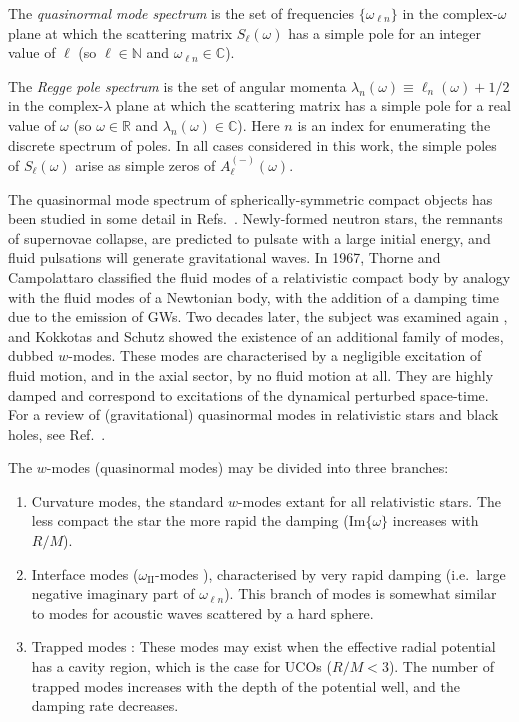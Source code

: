 \documentclass[aps,prd,longbibliography,reprint,twocolumn,amsmath,amssymb,amsfonts,showpacs,footnote,superscriptaddress]{revtex4-1}%
\begin{document}
The \emph{quasinormal mode spectrum} is the set of frequencies $\{ \omega_{\ell n} \}$ in the complex-$\omega$ plane at which the scattering matrix $ S_{\ell}(\omega)$ has a simple pole for an integer value of $\ell$ (so $\ell \in \mathbb{N}$ and $\omega_{\ell n} \in \mathbb{C}$).

The \emph{Regge pole spectrum} is the set of angular momenta $\lambda_{n}(\omega) \equiv \ell_{n}(\omega) + 1/2$ in the complex-$\lambda$ plane at which the scattering matrix has a simple pole for a real value of $\omega$ (so $\omega \in \mathbb{R}$ and $\lambda_{n}(\omega) \in \mathbb{C}$). Here $n$ is an index for enumerating the discrete spectrum of poles. In all cases considered in this work, the simple poles of $S_{\ell}(\omega)$ arise as simple zeros of $A_{\ell}^{(-)}(\omega)$.

The quasinormal mode spectrum of spherically-symmetric compact objects has been studied in some detail in Refs.~\cite{Kokkotas:1986gd,Kokkotas:1992ka,Andersson:1997eq,Kokkotas:1999bd,Leins:1993zz}.
Newly-formed neutron stars, the remnants of supernovae collapse, are predicted to pulsate with a large initial energy, and fluid pulsations will generate gravitational waves. In 1967, Thorne and Campolattaro \cite{thorne1967non} classified the fluid modes of a relativistic compact body by analogy with the fluid modes of a Newtonian body, with the addition of a damping time due to the emission of GWs. Two decades later, the subject was examined again \cite{Detweiler:1985zz,Kokkotas:1986gd}, and Kokkotas and Schutz \cite{Kokkotas:1992ka} showed the existence of an additional family of modes, dubbed $w$-modes. These modes are characterised by a negligible excitation of fluid motion, and in the axial sector, by no fluid motion at all. They are highly damped and correspond to excitations of the dynamical perturbed space-time. For a review of (gravitational) quasinormal modes in relativistic stars and black holes, see Ref.~\cite{Kokkotas:1999bd}.

The $w$-modes (quasinormal modes) may be divided into three branches:
	\begin{enumerate}
   \item Curvature modes, the standard $w$-modes extant for all relativistic stars. The less compact the star the more rapid the damping (Im$\{\omega\}$ increases with $R/M$).
   \item Interface modes ($\omega_{\text{II}}$-modes \cite{Leins:1993zz}), characterised by very rapid damping (i.e.~large negative imaginary part of $\omega_{\ell n}$). This branch of modes is somewhat similar to modes for acoustic waves scattered by a hard sphere.
   \item Trapped modes \cite{Chandrasekhar449}: These modes may exist when the effective radial potential has a cavity region, which is the case for UCOs ($R/M < 3$). %
   The number of trapped modes increases with the depth of the potential well, and the damping rate decreases.
	\end{enumerate}
\end{document}
